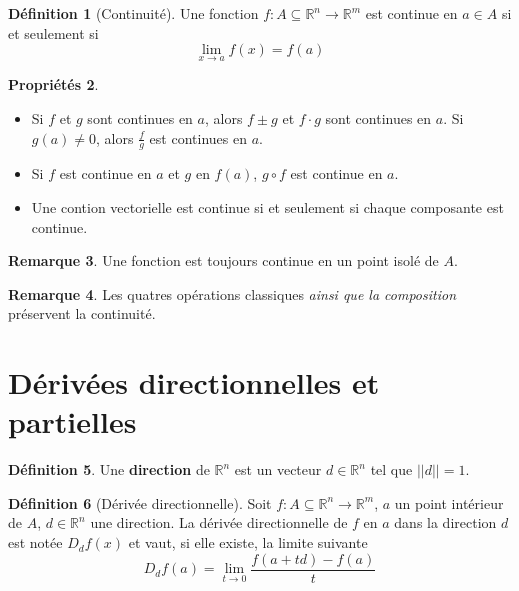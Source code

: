 \documentclass[11pt,a4paper]{article}
\theoremstyle{definition}
\newtheorem{mydef}{Définition}%
\newtheorem{myprop}[mydef]{Propriétés}
\newtheorem{myrem}[mydef]{Remarque}
\newcommand{\R}{\mathbb{R}}
\newcommand{\Rn}{\R^n}
\newcommand*\InsertTheoremBreak{%
	\begingroup %
		\setlength\itemsep{0pt}%
		\setlength\parsep{0pt}%
		\item[\vbox{\null}]%
	\endgroup%
}%
\begin{document}
\begin{mydef}[Continuité]
	Une fonction $f : A \subseteq \R^n \rightarrow \R^m$ est continue en $a \in A$ si et seulement si
	\[ \lim_{x \rightarrow a}f(x) = f(a) \]
\end{mydef}

\begin{myprop}\InsertTheoremBreak
	\begin{itemize}
		\item Si $f$ et $g$ sont continues en $a$, alors
			$f \pm g$ et $f \cdot g$ sont continues en $a$.
			Si $g(a) \neq 0$, alors $\frac{f}{g}$ est continues en $a$.

		\item Si $f$ est continue en $a$ et $g$ en $f(a)$,
			$g \circ f$ est continue en $a$.

		\item Une contion vectorielle est continue si et seulement si chaque composante est continue.
	\end{itemize}
\end{myprop}

\begin{myrem}
	Une fonction est toujours continue en un point isolé de $A$.
\end{myrem}

\begin{myrem}
	Les quatres opérations classiques \emph{ainsi que la composition} préservent la continuité.
\end{myrem}



\section{Dérivées directionnelles et partielles}

\begin{mydef}
	Une \textbf{direction} de $\Rn$ est un vecteur $d \in \Rn$ tel que $||d|| = 1$.
\end{mydef}

\begin{mydef}[Dérivée directionnelle] Soit $f : A \subseteq \R^n \to \R^m$, $a$ un point intérieur de $A$, $d \in \R^n$ une direction. La dérivée directionnelle de $f$ en $a$ dans la direction $d$ est notée $D_df(x)$ et vaut, si elle existe, la limite suivante
	\[ D_df(a) = \lim_{t \to 0} \frac{f(a+td) - f(a)}{t} \]
\end{mydef}
\end{document}
